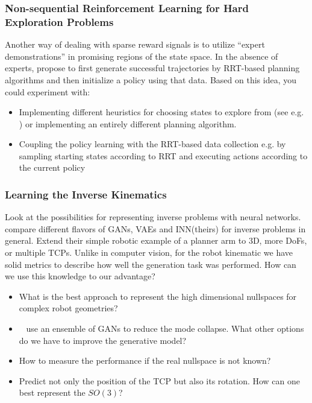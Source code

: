 \documentclass[a4paper]{article}
\begin{document}
\subsubsection{Non-sequential Reinforcement Learning for Hard Exploration Problems}
Another way of dealing with sparse reward signals is to utilize ``expert demonstrations'' in promising regions of the state space. In the absence of experts, \citet{blau2021learning} propose to first generate successful trajectories by RRT-based planning algorithms and then initialize a policy using that data. Based on this idea, you could experiment with:
\begin{itemize}
  \item Implementing different heuristics for choosing states to explore from (see e.g. \citet{ecoffet2019go}) or implementing an entirely different planning algorithm.
  \item Coupling the policy learning with the RRT-based data collection e.g. by sampling starting states according to RRT and executing actions according to the current policy
\end{itemize}

\subsubsection{Learning the Inverse Kinematics}
Look at the possibilities for representing inverse problems with neural networks.
~\citet{Ardizzone2018} compare different flavors of GANs, VAEs and INN(theirs) for inverse problems in general.
Extend their simple robotic example of a planner arm to 3D, more DoFs, or multiple TCPs.
Unlike in computer vision, for the robot kinematic we have solid metrics to describe how well the generation task was performed.
How can we use this knowledge to our advantage?
\begin{itemize}
  \item What is the best approach to represent the high dimensional nullspaces for complex robot geometries?
  \item ~\citet{Lembono2021} use an ensemble of GANs to reduce the mode collapse.
        What other options do we have to improve the generative model?
  \item How to measure the performance if the real nullspace is not known?
  \item Predict not only the position of the TCP but also its rotation.
        How can one best represent the $SO(3)$?
\end{itemize}
\end{document}
